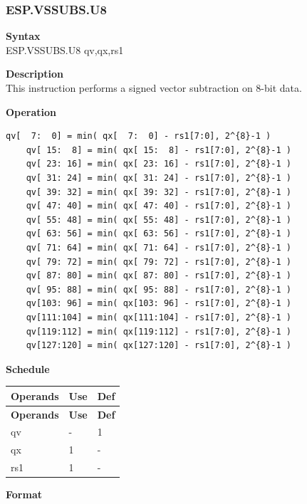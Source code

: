 \newpage
\subsubsection{ESP.VSSUBS.U8}\label{instruction:ESPVSSUBSU8}
\textbf{Syntax}\\
ESP.VSSUBS.U8 qv,qx,rs1

\textbf{Description}\\
This instruction performs a signed vector subtraction on 8-bit data.

\textbf{Operation}\\
\begin{lstlisting}[escapeinside=`?]
    qv[  7:  0] = min( qx[  7:  0] - rs1[7:0], 2^{8}-1 )
    qv[ 15:  8] = min( qx[ 15:  8] - rs1[7:0], 2^{8}-1 )
    qv[ 23: 16] = min( qx[ 23: 16] - rs1[7:0], 2^{8}-1 )
    qv[ 31: 24] = min( qx[ 31: 24] - rs1[7:0], 2^{8}-1 )
    qv[ 39: 32] = min( qx[ 39: 32] - rs1[7:0], 2^{8}-1 )
    qv[ 47: 40] = min( qx[ 47: 40] - rs1[7:0], 2^{8}-1 )
    qv[ 55: 48] = min( qx[ 55: 48] - rs1[7:0], 2^{8}-1 )
    qv[ 63: 56] = min( qx[ 63: 56] - rs1[7:0], 2^{8}-1 )
    qv[ 71: 64] = min( qx[ 71: 64] - rs1[7:0], 2^{8}-1 )
    qv[ 79: 72] = min( qx[ 79: 72] - rs1[7:0], 2^{8}-1 )
    qv[ 87: 80] = min( qx[ 87: 80] - rs1[7:0], 2^{8}-1 )
    qv[ 95: 88] = min( qx[ 95: 88] - rs1[7:0], 2^{8}-1 )
    qv[103: 96] = min( qx[103: 96] - rs1[7:0], 2^{8}-1 )
    qv[111:104] = min( qx[111:104] - rs1[7:0], 2^{8}-1 )
    qv[119:112] = min( qx[119:112] - rs1[7:0], 2^{8}-1 )
    qv[127:120] = min( qx[127:120] - rs1[7:0], 2^{8}-1 )
\end{lstlisting}


\textbf{Schedule}\\
\begin{longtable}[c]{|l|l|l|}
    \hline
    \rowcolor{lightgray}
    \textbf{Operands} & \textbf{Use} & \textbf{Def} \\\hline
    \endfirsthead
    \hline
    \rowcolor{lightgray}
     \textbf{Operands} & \textbf{Use} & \textbf{Def} \\\hline
    \endhead
    \hline
    \endfoot

  qv & - & 1 \\\hline
    qx & 1 & - \\\hline
    rs1 & 1 & -

\end{longtable}

\textbf{Format}\\

